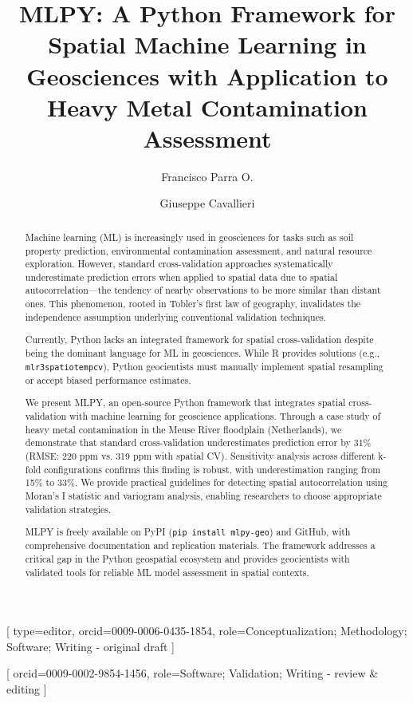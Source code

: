 \documentclass[a4paper,fleqn]{cas-sc}
\begin{document}
\let\WriteBookmarks\relax
\def\floatpagepagefraction{1}
\def\textpagefraction{.001}


\title[mode=title]{MLPY: A Python Framework for Spatial Machine Learning in Geosciences with Application to Heavy Metal Contamination Assessment}

\author[1]{Francisco Parra O.}[
    type=editor,
    orcid=0009-0006-0435-1854,
    role=Conceptualization; Methodology; Software; Writing - original draft
]

\author[1]{Giuseppe Cavallieri}[
    orcid=0009-0002-9854-1456,
    role=Software; Validation; Writing - review \& editing
]

\address[1]{Department of Computer Science, Universidad de Santiago de Chile, Santiago, Chile}

\begin{abstract}
Machine learning (ML) is increasingly used in geosciences for tasks such as soil property prediction, environmental contamination assessment, and natural resource exploration. However, standard cross-validation approaches systematically underestimate prediction errors when applied to spatial data due to spatial autocorrelation---the tendency of nearby observations to be more similar than distant ones. This phenomenon, rooted in Tobler's first law of geography, invalidates the independence assumption underlying conventional validation techniques.

Currently, Python lacks an integrated framework for spatial cross-validation despite being the dominant language for ML in geosciences. While R provides solutions (e.g., \texttt{mlr3spatiotempcv}), Python geocientists must manually implement spatial resampling or accept biased performance estimates.

We present MLPY, an open-source Python framework that integrates spatial cross-validation with machine learning for geoscience applications. Through a case study of heavy metal contamination in the Meuse River floodplain (Netherlands), we demonstrate that standard cross-validation underestimates prediction error by 31\% (RMSE: 220 ppm vs. 319 ppm with spatial CV). Sensitivity analysis across different k-fold configurations confirms this finding is robust, with underestimation ranging from 15\% to 33\%. We provide practical guidelines for detecting spatial autocorrelation using Moran's I statistic and variogram analysis, enabling researchers to choose appropriate validation strategies.

MLPY is freely available on PyPI (\texttt{pip install mlpy-geo}) and GitHub, with comprehensive documentation and replication materials. The framework addresses a critical gap in the Python geospatial ecosystem and provides geocientists with validated tools for reliable ML model assessment in spatial contexts.
\end{abstract}
\end{document}
